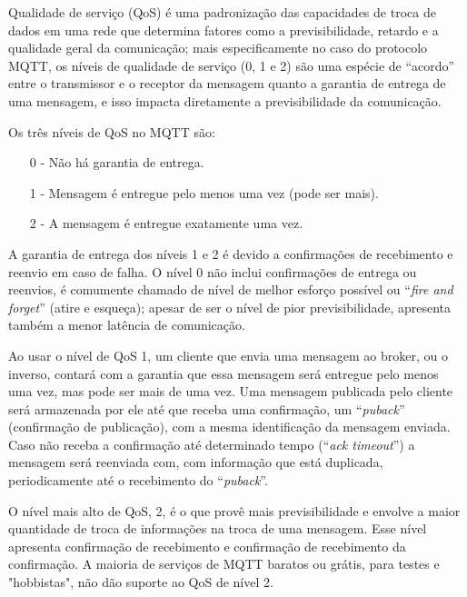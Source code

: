 Qualidade de serviço (\acl{QoS}) é uma padronização das capacidades de troca de dados em uma rede que determina fatores como a previsibilidade, retardo e a qualidade geral da comunicação; mais especificamente no caso do protocolo MQTT, os níveis de qualidade de serviço (0, 1 e 2) são uma espécie de “acordo” entre o transmissor e o receptor da mensagem quanto a garantia de entrega de uma mensagem, e isso impacta diretamente a previsibilidade da comunicação.

Os três níveis de QoS no MQTT são:
\begin{itemize}
    \item[0 -] Não há garantia de entrega.
    \item[1 -] Mensagem é entregue pelo menos uma vez (pode ser mais).
    \item[2 -] A mensagem é entregue exatamente uma vez.
\end{itemize}

A garantia de entrega dos níveis 1 e 2 é devido a confirmações de recebimento e reenvio em caso de falha. O nível 0 não inclui confirmações de entrega ou reenvios, é comumente chamado de nível de melhor esforço possível ou “\textit{fire and forget}” (atire e esqueça); apesar de ser o nível de pior previsibilidade, apresenta também a menor latência de comunicação.

Ao usar o nível de QoS 1, um cliente que envia uma mensagem ao broker, ou o inverso, contará com a garantia que essa mensagem será entregue pelo menos uma vez, mas pode ser mais de uma vez. Uma mensagem publicada pelo cliente será armazenada por ele até que receba uma confirmação, um “\textit{puback}” (confirmação de publicação), com a mesma identificação da mensagem enviada. Caso não receba a confirmação até determinado tempo (“\textit{ack timeout}”) a mensagem será reenviada com, com informação que está duplicada, periodicamente até o recebimento do “\textit{puback}”.

O nível mais alto de QoS, 2, é o que provê mais previsibilidade e envolve a maior quantidade de troca de informações na troca de uma mensagem. Esse nível apresenta confirmação de recebimento e confirmação de recebimento da confirmação. A maioria de serviços de MQTT baratos ou grátis, para testes e "hobbistas", não dão suporte ao QoS de nível 2.


